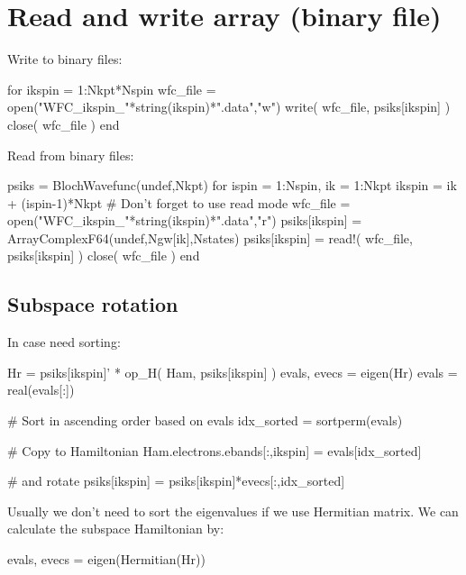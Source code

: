 \section{Read and write array (binary file)}

Write to binary files:
\begin{juliacode}
for ikspin = 1:Nkpt*Nspin
    wfc_file = open("WFC_ikspin_"*string(ikspin)*".data","w")
    write( wfc_file, psiks[ikspin] )
    close( wfc_file )
end
\end{juliacode}

Read from binary files:
\begin{juliacode}
psiks = BlochWavefunc(undef,Nkpt)
for ispin = 1:Nspin, ik = 1:Nkpt
    ikspin = ik + (ispin-1)*Nkpt
    # Don't forget to use read mode
    wfc_file = open("WFC_ikspin_"*string(ikspin)*".data","r")
    psiks[ikspin] = Array{ComplexF64}(undef,Ngw[ik],Nstates)
    psiks[ikspin] = read!( wfc_file, psiks[ikspin] )
    close( wfc_file )
end
\end{juliacode}




\subsection*{Subspace rotation}

In case need sorting:
\begin{juliacode}
Hr = psiks[ikspin]' * op_H( Ham, psiks[ikspin] )
evals, evecs = eigen(Hr)
evals = real(evals[:])

# Sort in ascending order based on evals
idx_sorted = sortperm(evals)

# Copy to Hamiltonian
Ham.electrons.ebands[:,ikspin] = evals[idx_sorted]

# and rotate
psiks[ikspin] = psiks[ikspin]*evecs[:,idx_sorted]
\end{juliacode}

Usually we don't need to sort the eigenvalues if we use Hermitian matrix. We can calculate the
subspace Hamiltonian by:
\begin{juliacode}
evals, evecs = eigen(Hermitian(Hr))
\end{juliacode}
